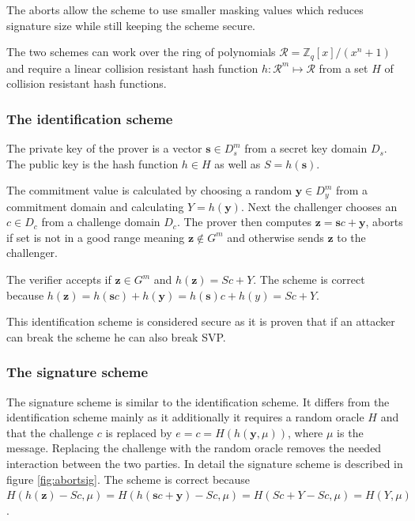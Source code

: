 \documentclass[a4paper,titlepage]{article}
\begin{document}
The aborts allow the scheme to use smaller masking values which reduces signature size while still keeping the scheme secure.

The two schemes can work over the ring of polynomials $\mathcal{R} = \mathds{Z}_q[x] / (x^n + 1)$ and require a linear collision resistant hash function $h: \mathcal{R}^m \mapsto \mathcal{R}$ from a set $H$ of collision resistant hash functions.

\subsubsection{The identification scheme}
The private key of the prover is a vector $\bm{s} \in D_s^m$ from a secret key domain $D_s$.
The public key is the hash function $h \in H$ as well as $S = h(\bm{s})$.

The commitment value is calculated by choosing a random $\bm{y} \in D_y^m$ from a commitment domain and calculating $Y = h(\bm{y})$.
Next the challenger chooses an $c \in D_c$ from a challenge domain $D_c$. The prover then computes $\bm{z} = \bm{s}c + \bm{y}$, aborts if set is not in a good range meaning $\bm{z} \notin G^m$ and otherwise sends $\bm{z}$ to the challenger.

The verifier accepts if $\bm{z} \in G^m$ and $h(\bm{z}) = Sc+Y$. The scheme is correct because $h(\bm{z})= h(\bm{s} c) + h(\bm{y}) = h(\bm{s}) c + h(y) =Sc+Y$.

This identification scheme is considered secure as it is proven that if an attacker can break the scheme he can also break SVP.

\subsubsection{The signature scheme}
The signature scheme is similar to the identification scheme. It differs from the identification scheme mainly as it additionally it requires a random oracle $H$ and that the challenge $c$ is replaced by $e = c = H(h(\bm{y},\mu))$, where $μ$ is the message. Replacing the challenge with the random oracle removes the needed interaction between the two parties. In detail the signature scheme is described in figure \ref{fig:abortsig}. The scheme is correct because $H(h(\bm{z}) - Sc, \mu) = H(h(\bm{s} c + \bm{y}) - Sc, \mu) = H(S c + Y - Sc, \mu) = H(Y, \mu)$.
\end{document}
